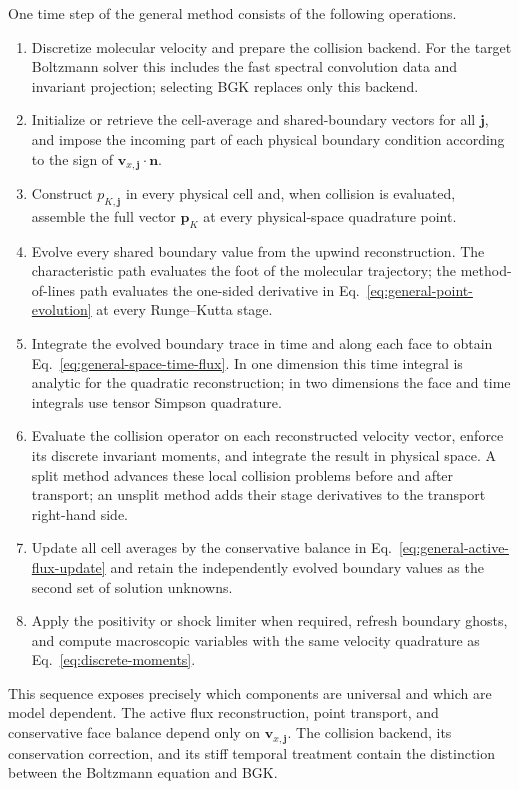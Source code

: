 \documentclass[preprint,3p,12pt]{elsarticle}
\newcommand{\vct}[1]{\boldsymbol{#1}}
\begin{document}
One time step of the general method consists of the following operations.
\begin{enumerate}
  \item Discretize molecular velocity and prepare the collision backend. For the target Boltzmann solver this includes the fast spectral convolution data and invariant projection; selecting BGK replaces only this backend.
  \item Initialize or retrieve the cell-average and shared-boundary vectors for all $\vct{j}$, and impose the incoming part of each physical boundary condition according to the sign of $\vct{v}_{x,\vct{j}}\cdot\vct{n}$.
  \item Construct $p_{K,\vct{j}}$ in every physical cell and, when collision is evaluated, assemble the full vector $\vct{p}_K$ at every physical-space quadrature point.
  \item Evolve every shared boundary value from the upwind reconstruction. The characteristic path evaluates the foot of the molecular trajectory; the method-of-lines path evaluates the one-sided derivative in Eq.~\eqref{eq:general-point-evolution} at every Runge--Kutta stage.
  \item Integrate the evolved boundary trace in time and along each face to obtain Eq.~\eqref{eq:general-space-time-flux}. In one dimension this time integral is analytic for the quadratic reconstruction; in two dimensions the face and time integrals use tensor Simpson quadrature.
  \item Evaluate the collision operator on each reconstructed velocity vector, enforce its discrete invariant moments, and integrate the result in physical space. A split method advances these local collision problems before and after transport; an unsplit method adds their stage derivatives to the transport right-hand side.
  \item Update all cell averages by the conservative balance in Eq.~\eqref{eq:general-active-flux-update} and retain the independently evolved boundary values as the second set of solution unknowns.
  \item Apply the positivity or shock limiter when required, refresh boundary ghosts, and compute macroscopic variables with the same velocity quadrature as Eq.~\eqref{eq:discrete-moments}.
\end{enumerate}
This sequence exposes precisely which components are universal and which are model dependent. The active flux reconstruction, point transport, and conservative face balance depend only on $\vct{v}_{x,\vct{j}}$. The collision backend, its conservation correction, and its stiff temporal treatment contain the distinction between the Boltzmann equation and BGK.
\end{document}
